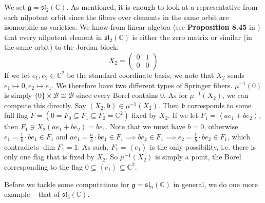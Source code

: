 \documentclass[11pt]{article}
\newcommand{\C}{\mathbb{C}}
\theoremstyle{definition}
\numberwithin{equation}{section} %
\begin{document}
\begin{example}
    We set $\mathfrak{g} = \mathfrak{sl}_2(\C)$. As mentioned, it is enough to look at a representative from each nilpotent orbit since the fibers over elements in the same orbit are isomorphic as varieties. We know from linear algebra (see \textbf{Proposition 8.45} in \cite{Axler2024LinearAlgebraDoneRight}) that every nilpotent element in $\mathfrak{sl}_2(\C)$ is either the zero matrix or similar (in the same orbit) to the Jordan block:
    $$
    X_2 = \begin{pmatrix} 0 & 1 \\ 0 & 0 \end{pmatrix}
    $$
    If we let $e_1,e_2 \in \C^2$ be the standard coordinate basis, we note that $X_2$ sends $e_1\mapsto 0, e_2\mapsto e_1$. We therefore have two different types of Springer fibers. $\mu^{-1}(0)$ is simply $\{0\} \times \mathcal{B} \cong \mathcal{B}$ since every Borel contains $0$. As for $\mu^{-1}\left(X_2\right)$, we can compute this directly. Say $\left(X_2, \mathfrak{b}\right)\in \mu^{-1}\left(X_2\right)$. Then $\mathfrak{b}$ corresponds to some full flag $F = \left(0 = F_0\subseteq F_1\subseteq F_2=\C^2\right)$ fixed by $X_2$. If we let $F_1 = \left\langle ae_1+be_2\right\rangle$, then $F_1\ni X_2\left(ae_1 + be_2\right) = be_1$. Note that we must have $b=0$, otherwise $e_1 = \frac{1}{b}\cdot be_1\in F_1$ and $ae_1 = \frac{a}{b}\cdot be_1 \in F_1 \implies be_2 \in F_1\implies e_2 = \frac{1}{b} \cdot be_2 \in F_1$, which contradicts $\dim F_1 = 1$. As such, $F_1 = \left\langle e_1\right\rangle$ is the only possibility, i.e. there is only one flag that is fixed by $X_2$. So $\mu^{-1}\left(X_2\right)$ is simply a point, the Borel corresponding to the flag $0 \subseteq \left \langle e_1\right\rangle \subseteq \C^2$.
\end{example}

\smallskip 

\noindent Before we tackle some computations for $\mathfrak{g} = \mathfrak{sl}_n(\C)$ in general, we do one more example -- that of $\mathfrak{sl}_3(\C)$.
\end{document}
